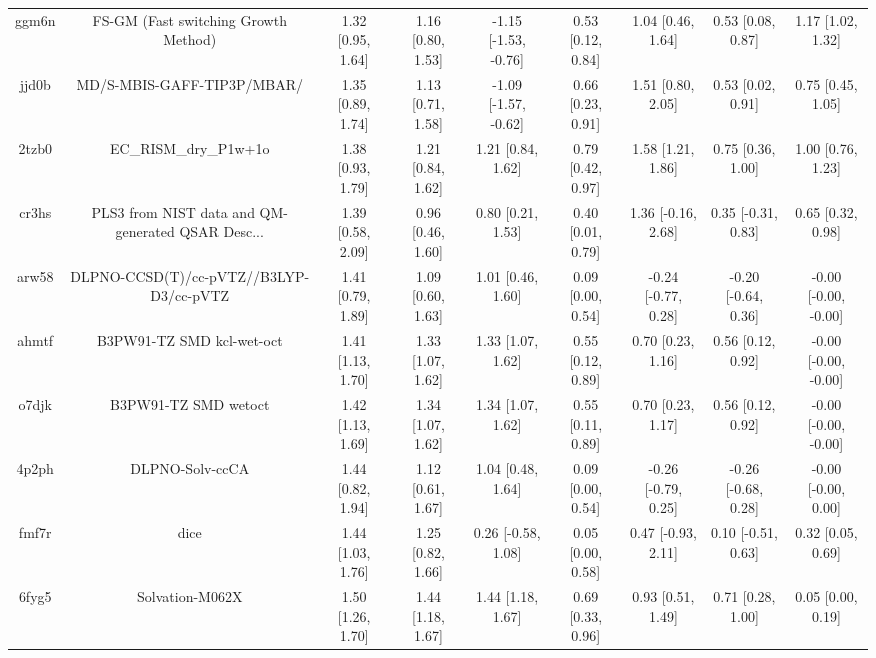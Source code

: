 \documentclass{article}
\begin{document}
\begin{center}
\begin{longtable}{|ccccccccc|}
 ggm6n &               FS-GM (Fast switching Growth Method) &  1.32 [0.95, 1.64] &  1.16 [0.80, 1.53] &  -1.15 [-1.53, -0.76] &  0.53 [0.12, 0.84] &    1.04 [0.46, 1.64] &    0.53 [0.08, 0.87] &     1.17 [1.02, 1.32] \\
 jjd0b &                         MD/S-MBIS-GAFF-TIP3P/MBAR/ &  1.35 [0.89, 1.74] &  1.13 [0.71, 1.58] &  -1.09 [-1.57, -0.62] &  0.66 [0.23, 0.91] &    1.51 [0.80, 2.05] &    0.53 [0.02, 0.91] &     0.75 [0.45, 1.05] \\
 2tzb0 &                              EC\_RISM\_dry\_P1w+1o &  1.38 [0.93, 1.79] &  1.21 [0.84, 1.62] &     1.21 [0.84, 1.62] &  0.79 [0.42, 0.97] &    1.58 [1.21, 1.86] &    0.75 [0.36, 1.00] &     1.00 [0.76, 1.23] \\
 cr3hs &  PLS3 from NIST data and QM-generated QSAR Desc... &  1.39 [0.58, 2.09] &  0.96 [0.46, 1.60] &     0.80 [0.21, 1.53] &  0.40 [0.01, 0.79] &   1.36 [-0.16, 2.68] &   0.35 [-0.31, 0.83] &     0.65 [0.32, 0.98] \\
 arw58 &            DLPNO-CCSD(T)/cc-pVTZ//B3LYP-D3/cc-pVTZ &  1.41 [0.79, 1.89] &  1.09 [0.60, 1.63] &     1.01 [0.46, 1.60] &  0.09 [0.00, 0.54] &  -0.24 [-0.77, 0.28] &  -0.20 [-0.64, 0.36] &  -0.00 [-0.00, -0.00] \\
 ahmtf &                          B3PW91-TZ SMD kcl-wet-oct &  1.41 [1.13, 1.70] &  1.33 [1.07, 1.62] &     1.33 [1.07, 1.62] &  0.55 [0.12, 0.89] &    0.70 [0.23, 1.16] &    0.56 [0.12, 0.92] &  -0.00 [-0.00, -0.00] \\
 o7djk &                               B3PW91-TZ SMD wetoct &  1.42 [1.13, 1.69] &  1.34 [1.07, 1.62] &     1.34 [1.07, 1.62] &  0.55 [0.11, 0.89] &    0.70 [0.23, 1.17] &    0.56 [0.12, 0.92] &  -0.00 [-0.00, -0.00] \\
 4p2ph &                                    DLPNO-Solv-ccCA &  1.44 [0.82, 1.94] &  1.12 [0.61, 1.67] &     1.04 [0.48, 1.64] &  0.09 [0.00, 0.54] &  -0.26 [-0.79, 0.25] &  -0.26 [-0.68, 0.28] &   -0.00 [-0.00, 0.00] \\
 fmf7r &                                               dice &  1.44 [1.03, 1.76] &  1.25 [0.82, 1.66] &    0.26 [-0.58, 1.08] &  0.05 [0.00, 0.58] &   0.47 [-0.93, 2.11] &   0.10 [-0.51, 0.63] &     0.32 [0.05, 0.69] \\
 6fyg5 &                                    Solvation-M062X &  1.50 [1.26, 1.70] &  1.44 [1.18, 1.67] &     1.44 [1.18, 1.67] &  0.69 [0.33, 0.96] &    0.93 [0.51, 1.49] &    0.71 [0.28, 1.00] &     0.05 [0.00, 0.19] \\

\end{longtable}
\end{center}
\end{document}
